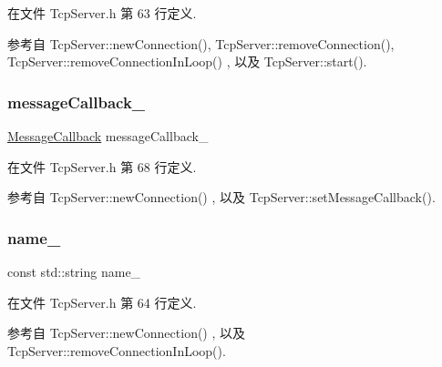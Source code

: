 在文件 Tcp\+Server.\+h 第 63 行定义.



参考自 Tcp\+Server\+::new\+Connection(), Tcp\+Server\+::remove\+Connection(), Tcp\+Server\+::remove\+Connection\+In\+Loop() , 以及 Tcp\+Server\+::start().

\mbox{\label{classmuduo_1_1TcpServer_aa4d5ea21d215329779698e634e5e7755}} 
\subsubsection{\texorpdfstring{message\+Callback\+\_\+}{messageCallback\_}}
{\footnotesize\ttfamily \hyperlink{namespacemuduo_ab8a96fa483cffe150618e01058e6fc1b}{Message\+Callback} message\+Callback\+\_\+\hspace{0.3cm}{\ttfamily [private]}}



在文件 Tcp\+Server.\+h 第 68 行定义.



参考自 Tcp\+Server\+::new\+Connection() , 以及 Tcp\+Server\+::set\+Message\+Callback().

\mbox{\label{classmuduo_1_1TcpServer_a723d30392e2c4f36252de0528a1b246d}} 
\subsubsection{\texorpdfstring{name\+\_\+}{name\_}}
{\footnotesize\ttfamily const std\+::string name\+\_\+\hspace{0.3cm}{\ttfamily [private]}}



在文件 Tcp\+Server.\+h 第 64 行定义.



参考自 Tcp\+Server\+::new\+Connection() , 以及 Tcp\+Server\+::remove\+Connection\+In\+Loop().

\mbox{\label{classmuduo_1_1TcpServer_aab950be51cdd74cb0fc104fa135e4853}} 
